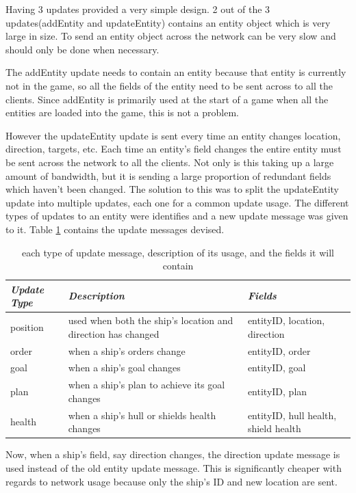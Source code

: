 Having 3 updates provided a very simple design. 
2 out of the 3 updates(addEntity and updateEntity) contains an entity object which is very large in size.
To send an entity object across the network can be very slow and should only be done when necessary.

The addEntity update needs to contain an entity because that entity is currently not in the game, so all the fields of the entity need to be sent across to all the clients. Since addEntity is primarily used at the start of a game when all the entities are loaded into the game, this is not a problem.

However the updateEntity update is sent every time an entity changes location, direction, targets, etc.
Each time an entity's field changes the entire entity must be sent across the network to all the clients.
Not only is this taking up a large amount of bandwidth, but it is sending a large proportion of redundant fields which haven't been changed.
The solution to this was to split the updateEntity update into multiple updates, each one for a common update usage.
The different types of updates to an entity were identifies and a new update message was given to it. 
Table \ref{tab:updateMessageTypes} contains the update messages devised.

\begin{table}
    \begin{tabular}{p{5em} p{15em} p{6em}}
    \toprule
    \emph{Update Type} & \emph{Description} & \emph{Fields} \\
    \midrule
    position & used when both the ship's location and direction has changed & entityID, location, direction \\
    order & when a ship's orders change & entityID, order \\
    goal & when a ship's goal changes & entityID, goal \\
    plan & when a ship's plan to achieve its goal changes & entityID, plan \\
    health & when a ship's hull or shields health changes & entityID, hull health, shield health \\ 
    \bottomrule
    \end{tabular}
    	\vspace{1em}
	\caption{each type of update message, description of its usage, and the fields it will contain}
	\label{tab:updateMessageTypes}
\end{table}

Now, when a ship's field, say direction changes, the direction update message is used instead of the old entity update message.
This is significantly cheaper with regards to network usage because only the ship's ID and new location are sent.

